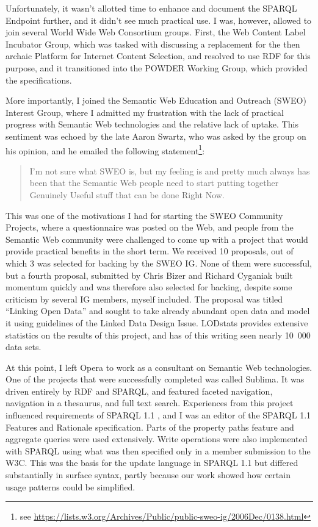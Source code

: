 Unfortunately, it wasn't allotted time to enhance and document the
SPARQL Endpoint further, and it didn't see much practical use. 
I was, however, allowed to join several World Wide Web Consortium
groups. First, the Web Content Label Incubator Group, which was tasked
with discussing a replacement for the then archaic Platform for
Internet Content Selection, and resolved to use RDF for this
purpose, and it transitioned into the POWDER Working Group, which
provided the specifications. 

More importantly, I joined the Semantic Web Education and Outreach
(SWEO) Interest Group, where I admitted my frustration with the lack
of practical progress with Semantic Web technologies and the relative
lack of uptake. This sentiment was echoed by the late Aaron Swartz,
who was asked by the group on his opinion, and he emailed the
following statement\footnote{see
  \url{https://lists.w3.org/Archives/Public/public-sweo-ig/2006Dec/0138.html}}:
\begin{quote}
I'm not sure what SWEO is, but my feeling is and pretty much always
has been that the Semantic Web people need to start putting together
Genuinely Useful stuff that can be done Right Now.
\end{quote}

This was one of the motivations I had for starting the SWEO Community
Projects, where a questionnaire was posted on the Web, and people from
the Semantic Web community were challenged to come up with a project
that would provide practical benefits in the short term. We received
10 proposals, out of which 3 was selected for backing by the SWEO
IG. None of them were successful, but a fourth proposal, submitted by
Chris Bizer and Richard Cyganiak built momentum quickly and was
therefore also selected for backing, despite some criticism by several
IG members, myself included. The proposal was titled ``Linking Open
Data'' and sought to take already abundant open data and model it
using guidelines of the Linked Data Design
Issue\cite{linkeddataissue}. LODstats\cite{auer2012lodstats} provides
extensive statistics on the results of this project, and has of this
writing seen nearly 10~000 data sets.

At this point, I left Opera to work as a consultant on Semantic Web
technologies. One of the projects that were successfully completed was
called Sublima\cite{sublima}. It was driven entirely by RDF and SPARQL,
and featured faceted navigation, navigation in a thesaurus, and full
text search. Experiences from this project influenced requirements of
SPARQL 1.1 \cite{sparql11query}, and I was an editor of the SPARQL 1.1 Features and
Rationale specification\cite{sparql11new}. Parts of the property paths
feature and aggregate queries were used extensively. Write operations
were also implemented with SPARQL using what was then specified only
in a member submission to the W3C\cite{seaborne2008sparql}. This was the basis for
the update language in SPARQL 1.1 but differed substantially in
surface syntax, partly because our work showed how certain usage patterns
could be simplified. 

